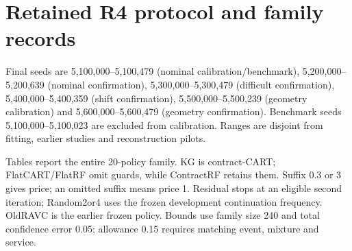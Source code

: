 
\section{Retained R4 protocol and family records}\label{supp:final}
Final seeds are 5,100,000--5,100,479 (nominal calibration/benchmark), 5,200,000--5,200,639 (nominal confirmation), 5,300,000--5,300,479 (difficult confirmation), 5,400,000--5,400,359 (shift confirmation), 5,500,000--5,500,239 (geometry calibration) and 5,600,000--5,600,479 (geometry confirmation). Benchmark seeds 5,100,000--5,100,023 are excluded from calibration. Ranges are disjoint from fitting, earlier studies and reconstruction pilots.

Tables report the entire 20-policy family. KG is contract-CART; FlatCART/FlatRF omit guards, while ContractRF retains them. Suffix 0.3 or 3 gives price; an omitted suffix means price 1. Residual stops at an eligible second iteration; Random2or4 uses the frozen development continuation frequency. OldRAVC is the earlier frozen policy. Bounds use family size 240 and total confidence error 0.05; allowance 0.15 requires matching event, mixture and service.

